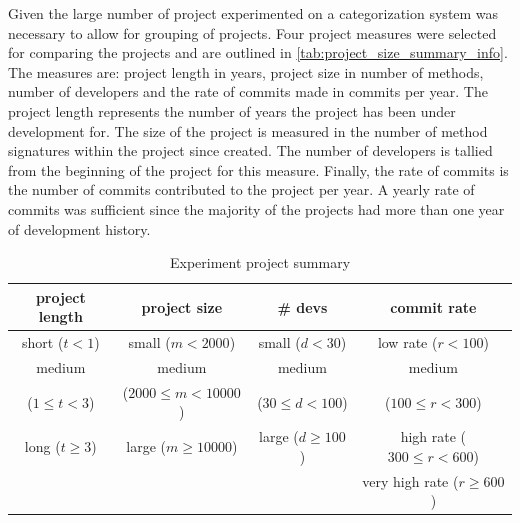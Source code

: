 Given the large number of project experimented on a categorization system was necessary to allow for grouping of projects. Four project measures were selected for comparing the projects and are outlined in \autoref{tab:project_size_summary_info}. The measures are: project length in years, project size in number of methods, number of developers and the rate of commits made in commits per year. The project length represents the number of years the project has been under development for. The size of the project is measured in the number of method signatures within the project since created. The number of developers is tallied from the beginning of the project for this measure. Finally, the rate of commits is the number of commits contributed to the project per year. A yearly rate of commits was sufficient since the majority of the projects had more than one year of development history.


\begin{table}
\begin{center}
    \begin{tabular}{|c|c|c|c|}
        \hline
        project length & project size & \# devs & commit rate \\
        \hline
        \hline
        short ($t < 1$) & small ($m < 2000$) & small ($d < 30$) & low rate ($r < 100$) \\
        \hline
        medium & medium & medium & medium \\
        ($1 \leq t < 3$) & ($2000 \leq m < 10000$) & ($30 \leq d < 100$) & ($100 \leq r < 300$) \\
        \hline
        long ($t \geq 3$) & large ($m \geq 10000$) & large ($d \geq 100$) & high rate ($300 \leq r < 600$) \\
        \hline
        & & & very high rate ($r \geq 600$) \\
        \hline
    \end{tabular}
\end{center}
\caption{Experiment project summary}
\label{tab:project_size_summary_info}
\end{table}


